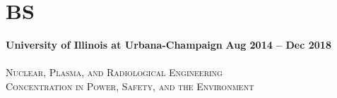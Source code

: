 \section{\mysidestyle BS}
\textbf{University of Illinois at Urbana-Champaign} \hfill\textbf{Aug 2014 -- Dec 2018}\vspace{-3mm}\\\vspace{-1mm}\\
\textsc{Nuclear, Plasma, and Radiological Engineering  \\ Concentration in Power, Safety, and the Environment}\hfill\\

